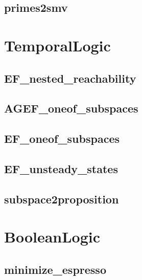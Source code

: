 \documentclass[letterpaper,10pt,english]{sphinxmanual}
\begin{document}
\subsection{primes2smv}
\label{\detokenize{ModelChecking:id8}}\label{\detokenize{ModelChecking:primes2smv}}

\section{TemporalLogic}
\label{\detokenize{TemporalLogic:temporallogic}}\label{\detokenize{TemporalLogic:networkx-has-path}}\label{\detokenize{TemporalLogic::doc}}\label{\detokenize{TemporalLogic:id1}}

\subsection{EF\_nested\_reachability}
\label{\detokenize{TemporalLogic:ef-nested-reachability}}

\subsection{AGEF\_oneof\_subspaces}
\label{\detokenize{TemporalLogic:agef-oneof-subspaces}}

\subsection{EF\_oneof\_subspaces}
\label{\detokenize{TemporalLogic:ef-oneof-subspaces}}

\subsection{EF\_unsteady\_states}
\label{\detokenize{TemporalLogic:ef-unsteady-states}}

\subsection{subspace2proposition}
\label{\detokenize{TemporalLogic:subspace2proposition}}

\section{BooleanLogic}
\label{\detokenize{BooleanLogic:booleanlogic}}\label{\detokenize{BooleanLogic::doc}}\label{\detokenize{BooleanLogic:id1}}

\subsection{minimize\_espresso}
\label{\detokenize{BooleanLogic:minimize-espresso}}\label{\detokenize{BooleanLogic:id2}}
\end{document}

